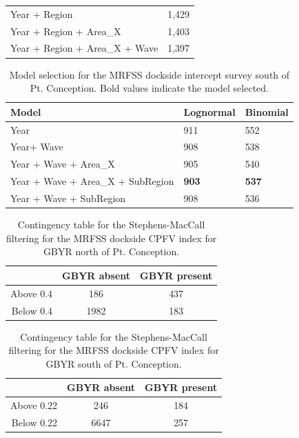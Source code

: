 \documentclass[12pt,]{article}
\begin{document}
\begin{table}[ht]
\begin{tabular}{ll}
  Year + Region & 1,429 \\ 
  Year + Region + Area\_X & 1,403 \\ 
  Year + Region + Area\_X + Wave & 1,397 \\ 
   \hline
\end{tabular}
\end{table}\begin{table}[ht]
\centering
\caption{Model selection for the MRFSS dockside intercept 
                                        survey south of Pt. Conception. Bold 
                                        values indicate the model selected.} 
\label{tab:Fleet11_AIC}
\begin{tabular}{lll}
  \hline
Model & Lognormal & Binomial \\ 
  \hline
Year & 911 & 552 \\ 
  Year+ Wave & 908 & 538 \\ 
  Year + Wave + Area\_X & 905 & 540 \\ 
  Year + Wave + Area\_X + SubRegion & \textbf{903} & \textbf{537} \\ 
  Year + Wave + SubRegion & 908 & 536 \\ 
   \hline
\end{tabular}
\end{table}

\begin{table}[ht]
\centering
\caption{Contingency table for the Stephens-MacCall 
                                            filtering for the MRFSS dockside CPFV index 
                                            for GBYR north of Pt. Conception.} 
\label{tab:Fleet10_contingency}
\begin{tabular}{rcc}
  \hline
  & GBYR absent & GBYR present \\ 
  \hline
Above 0.4 & 186 & 437 \\ 
  Below 0.4 & 1982 & 183 \\ 
   \hline
\end{tabular}
\end{table}

\begin{table}[ht]
\centering
\caption{Contingency table for the Stephens-MacCall 
                                            filtering for the MRFSS dockside CPFV index 
                                            for GBYR south of Pt. Conception.} 
\label{tab:Fleet11_contingency}
\begin{tabular}{rcc}
  \hline
  & GBYR absent & GBYR present \\ 
  \hline
Above 0.22 & 246 & 184 \\ 
  Below 0.22 & 6647 & 257 \\ 
   \hline
\end{tabular}
\end{table}
\end{document}
